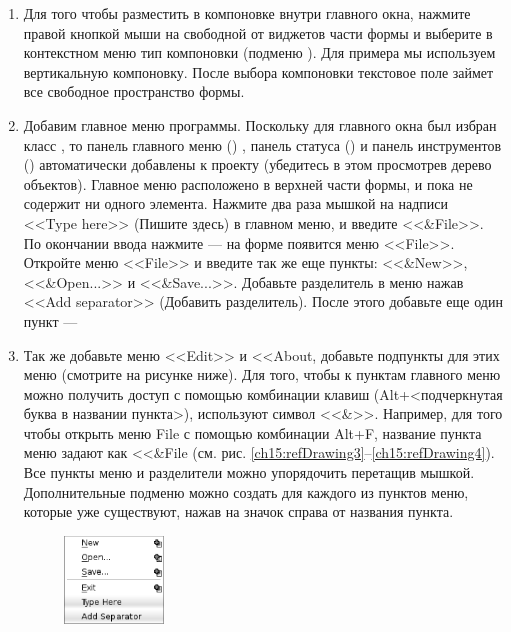 \begin{enumerate}
\item Для того чтобы разместить  в компоновке внутри главного окна, нажмите правой
кнопкой мыши на свободной от виджетов части формы и выберите в контекстном меню тип компоновки (подменю
). Для примера мы используем вертикальную компоновку. После выбора компоновки текстовое
поле займет все свободное пространство формы.
\item Добавим главное меню программы. Поскольку для главного окна был избран класс , то панель главного меню
() , панель статуса () и панель инструментов () автоматически добавлены к проекту (убедитесь в этом просмотрев дерево объектов). Главное меню расположено в верхней части формы, и пока не содержит ни одного
элемента. Нажмите два раза мышкой на надписи <<Type here>> (Пишите здесь) в главном меню, и введите <<\&File>>. По окончании
ввода нажмите  --- на форме появится меню <<File>>. Откройте меню <<File>> и введите так же
еще пункты: <<\&New>>, <<\&Open...>> и <<\&Save...>>. Добавьте разделитель в меню
нажав <<Add separator>> (Добавить разделитель). После этого добавьте еще один пункт ---  
\item Так же добавьте меню <<Edit>> и <<About, добавьте подпункты для этих меню (смотрите на
рисунке ниже). Для того, чтобы к пунктам главного меню можно получить доступ с помощью комбинации клавиш
(Alt+<подчеркнутая буква в названии пункта>), используют символ <<\&>>. Например,
для того чтобы открыть меню File с помощью комбинации Alt+F, название пункта меню задают как <<\&File
(см. рис. \ref{ch15:refDrawing3}--\ref{ch15:refDrawing4}). Все пункты меню и разделители можно упорядочить перетащив
мышкой. Дополнительные подменю можно создать для каждого из пунктов меню, которые уже существуют, нажав на значок
справа от названия пункта. 

{\footnotesize
   \begin{figure}%
   \begin{floatrow}[3]
   {\includegraphics[width=0.25\textwidth,keepaspectratio]{img/ris_15_4}}\hspace*{0.03\textwidth}


\end{floatrow}
\end{figure}}
\end{enumerate}
